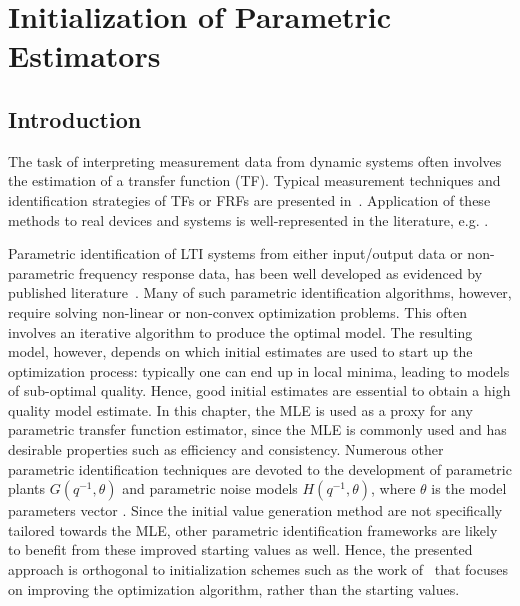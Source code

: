 \chapter{Initialization of Parametric Estimators}
\label{sec:initvals}
\gdef\thisDir{ch05-initvals}

\section{Introduction}
\label{sec:initial-values:introd}
The task of interpreting measurement data from dynamic systems often involves the estimation of a transfer function (TF). 
Typical measurement techniques and identification strategies of  \glspl{TF} or \glspl{FRF} are presented in~\citep{Schoukens1998,Schoukens2006LPM,Guillaume1996,Broersen1995,Pintelon2010LPM1,Antoni2007FRF}.
Application of these methods to real devices and systems is well-represented in the literature, e.g. \citep{Lim2010,Robinson1990,Behjat2010}.

Parametric identification of \gls{LTI} systems from either input/output data or non-parametric frequency response data, has been well developed as evidenced by published literature~\citep{Pintelon2012,Ljung1999,Schoukens1999,Pintelon1998}.
Many of such parametric identification algorithms, however, require solving non-linear or non-convex optimization problems.
This often involves an iterative algorithm to produce the optimal model.
 The resulting model, however, depends on which initial estimates are used to start up the optimization process: typically one can end up in local minima, leading to models of sub-optimal quality.
 Hence, good initial estimates are essential to obtain a high quality model estimate.
 In this chapter, the \gls{MLE} is used as a proxy for any parametric transfer function estimator, since the \gls{MLE} is commonly used and has desirable properties such as efficiency and consistency.
 Numerous other parametric identification techniques are devoted to the development of parametric plants $G(q^{-1},\theta)$ and parametric noise models  $H(q^{-1},\theta)$, where  $\theta$ is the model parameters vector  \citep{Ljung1999,Soderstrom1989,Pintelon2012}.
 Since the initial value generation method are not specifically tailored towards the \gls{MLE}, other parametric identification frameworks are likely to benefit from these improved starting values as well.
 Hence, the presented approach is orthogonal to initialization schemes such as the work of~\citet{vanHerpen2014} that focuses on improving the optimization algorithm, rather than the starting values.

